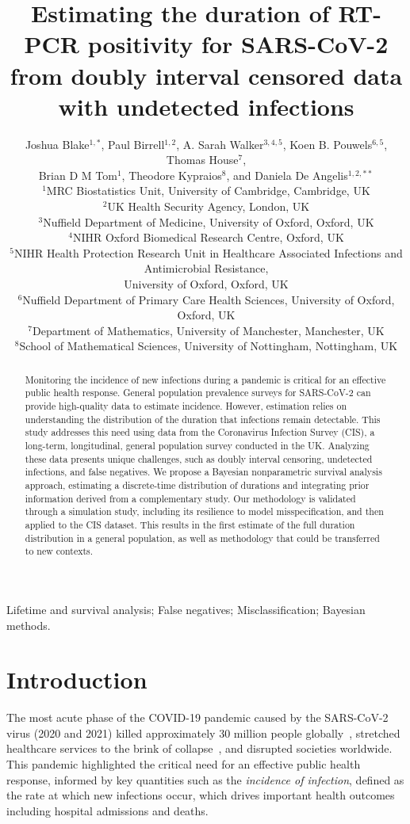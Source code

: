 \documentclass[referee,useAMS,usenatbib]{biom}
\title[Estimating duration]{Estimating the duration of RT-PCR positivity for SARS-CoV-2 from doubly interval censored data with undetected infections}
\author{Joshua Blake$^{1,*}$\email{joshua.blake@mrc-bsu.cam.ac.uk},
Paul Birrell$^{1,2}$,
A. Sarah Walker$^{3,4,5}$,
Koen B. Pouwels$^{6,5}$,
Thomas House$^{7}$, \\
Brian D M Tom$^{1}$,
Theodore Kypraios$^{8}$, and
Daniela De Angelis$^{1,2,**}$\email{daniela.deangelis@mrc-bsu.cam.ac.uk} \\
$^{1}$MRC Biostatistics Unit, University of Cambridge, Cambridge, UK \\
$^{2}$UK Health Security Agency, London, UK \\
$^{3}$Nuffield Department of Medicine, University of Oxford, Oxford, UK \\
$^{4}$NIHR Oxford Biomedical Research Centre, Oxford, UK \\
$^{5}$NIHR Health Protection Research Unit in Healthcare Associated Infections and Antimicrobial Resistance, \\ University of Oxford, Oxford, UK \\
$^{6}$Nuffield Department of Primary Care Health Sciences, University of Oxford, Oxford, UK \\
$^{7}$Department of Mathematics, University of Manchester, Manchester, UK \\
$^{8}$School of Mathematical Sciences, University of Nottingham, Nottingham, UK}
\begin{document}
\pagerange{\pageref{firstpage}--\pageref{lastpage}} 

\label{firstpage}

\begin{abstract}
Monitoring the incidence of new infections during a pandemic is critical for an effective public health response. General population prevalence surveys for SARS-CoV-2 can provide high-quality data to estimate incidence.  However, estimation relies on understanding the distribution of the duration that infections remain detectable. This study addresses this need using data from the Coronavirus Infection Survey (CIS), a long-term, longitudinal, general population survey conducted in the UK. Analyzing these data presents unique challenges, such as doubly interval censoring, undetected infections, and false negatives. We propose a Bayesian nonparametric survival analysis approach, estimating a discrete-time distribution of durations and integrating prior information derived from a complementary study. Our methodology is validated through a simulation study, including its resilience to model misspecification, and then applied to the CIS dataset. This results in the first estimate of the full duration distribution in a general population, as well as methodology that could be transferred to new contexts.
\end{abstract}

\begin{keywords}  Lifetime and survival analysis; False negatives; Misclassification; Bayesian methods. \end{keywords}

\maketitle


\section{Introduction} \label{sec:intro}

The most acute phase of the COVID-19 pandemic caused by the SARS-CoV-2 virus (2020 and 2021) killed approximately 30 million people globally~\citep{whoCOVIDExcess}, stretched healthcare services to the brink of collapse~\citep{fongNHS}, and disrupted societies worldwide.
This pandemic highlighted the critical need for an effective public health response, informed by key quantities such as the \emph{incidence of infection}, defined as the rate at which new infections occur, which drives important health outcomes including hospital admissions and deaths. 
\end{document}
